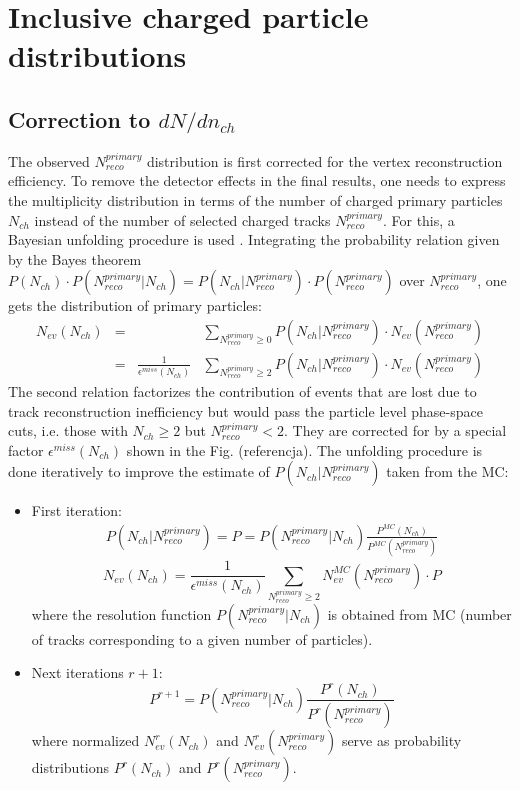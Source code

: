 \section{Inclusive charged particle distributions}
\subsection{Correction to $dN/dn_{ch}$}
The observed $N^{primary}_{reco}$ distribution is first corrected for the vertex reconstruction efficiency.  To remove the detector effects in the final results, one needs to express the multiplicity distribution in terms
of the number of charged primary particles $N_{ch}$ instead of the number of selected charged tracks $N^{primary}_{reco}$. For
this, a Bayesian unfolding procedure is used \cite{DAGOSTINI1995487}. Integrating the probability relation given by the Bayes
theorem $P(N_{ch})\cdot P(N^{primary}_{reco}|N_{ch}) = P(N_{ch}|N^{primary}_{reco})\cdot P(N^{primary}_{reco})$ over $N^{primary}_{reco}$, one gets the distribution of primary particles:
\begin{equation}
\begin{array}{ccccc}
	N_{ev}(N_{ch})&=&&\sum_{N^{primary}_{reco}\geq0}P(N_{ch}|N^{primary}_{reco})\cdot N_{ev}(N^{primary}_{reco})\\
	&=&\frac{1}{\epsilon^{miss}(N_{ch})}&\sum_{N^{primary}_{reco}\geq2}P(N_{ch}|N^{primary}_{reco})\cdot N_{ev}(N^{primary}_{reco})
\end{array}
\end{equation}
The second relation factorizes the contribution of events that are lost due to track reconstruction inefficiency
but would pass the particle level phase-space cuts, i.e. those with $N_{ch}\geq2$ but $N^{primary}_{reco}<2$. They are corrected
for by a special factor $\epsilon^{miss}(N_{ch})$ shown in the Fig. (referencja). The unfolding procedure is done iteratively to improve the estimate of $P(N_{ch}|N^{primary}_{reco})$ taken from the MC:
\begin{itemize}
	\item First iteration: \\
\begin{eqnarray}
P(N_{ch}|N^{primary}_{reco}) = P = P(N^{primary}_{reco}|N_{ch})\frac{P^{MC}(N_{ch})}{P^{MC}(N^{primary}_{reco})}
\end{eqnarray}
\begin{equation}
N_{ev}(N_{ch})=\frac{1}{\epsilon^{miss}(N_{ch})}\sum_{N^{primary}_{reco}\geq2}N_{ev}^{MC}(N^{primary}_{reco})\cdot P
\end{equation}
where the resolution function $P(N^{primary}_{reco}|N_{ch})$ is obtained from MC (number of tracks corresponding to a given number of particles).

\item Next iterations $r+1$:
\begin{equation}
P^{r+1}=P(N^{primary}_{reco}|N_{ch})\frac{P^{r}(N_{ch})}{P^{r}(N^{primary}_{reco})}
\end{equation}
where normalized $N_{ev}^r(N_{ch})$ and $N_{ev}^r(N^{primary}_{reco})$ serve as probability distributions $P^{r}(N_{ch})$ and $P^{r}(N^{primary}_{reco})$.
\end{itemize}

